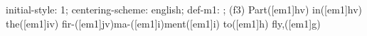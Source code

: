 initial-style: 1;
centering-scheme: english;
def-m1: \grealign;
(f3) Part([em1]hv) in([em1]hv) the([em1]iv) fir-([em1]jv)ma-([em1]i)ment([em1]i) to([em1]h) fly,([em1]g)